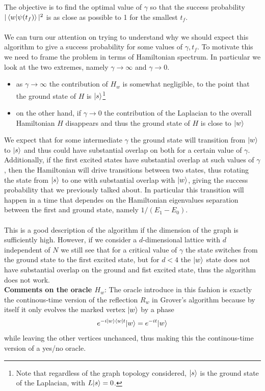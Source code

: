 \noindent
The objective is to find the optimal value of $\gamma$ so that the success probability $|\braket{w|\psi(t_f)}|^2$ is as close as possible to 1 for the smallest $t_f$. \\ \\
We can turn our attention on trying to understand why we should expect this algorithm to give a success probability for some values of $\gamma, t_f$. To motivate this we need to frame the problem in terms of Hamiltonian spectrum. In particular we look at the two extremes, namely $\gamma\rightarrow\infty$ and $\gamma\rightarrow 0$.
\begin{itemize}
  \item as $\gamma\rightarrow\infty$ the contribution of $H_w$ is somewhat negligible, to the point that the ground state of $H$ is ${|{s}\rangle}$\footnote{Note that regardless of the graph topology considered, ${|{s}\rangle}$ is the ground state of the Laplacian, with $L{|{s}\rangle} = 0$.}
  \item on the other hand, if $\gamma\rightarrow 0$ the contribution of the Laplacian to the overall Hamiltonian $H$ disappears and thus the ground state of $H$ is close to ${|{w}\rangle}$
\end{itemize}
We expect that for some intermediate $\gamma$ the ground state will transition from ${|{w}\rangle}$ to ${|{s}\rangle}$ and thus could have substantial overlap on both for a certain value of $\gamma$. Additionally, if the first excited states have substantial overlap at such values of $\gamma$, then the Hamiltonian will drive transitions between two states, thus rotating the state from ${|{s}\rangle}$ to one with substantial overlap with ${|{w}\rangle}$, giving the success probability that we previously talked about. In particular this transition will happen in a time that dependes on the Hamiltonian eigenvalues separation between the first and ground state, namely $1/(E_1-E_0)$. \\ \\This is a good description of the algorithm if the dimension of the graph is sufficiently high.  However, if we consider a $d$-dimensional lattice with $d$ independent of $N$ we still see that for a critical value of $\gamma$ the state switches from the ground state to the first excited state, but for $d<4$ the ${|{w}\rangle}$ state does not have substantial overlap on the ground and fist excited state, thus the algorithm does not work. \\
\textbf{Comments on the oracle $H_w$}: The oracle introduce in this fashion is exactly the continous-time version of the reflection $R_w$ in Grover's algorithm \cite{Wong2016} because by itself it only evolves the marked vertex ${|{w}\rangle}$ by a phase
\begin{equation}
  e^{-i{|{w}\rangle}{\langle{w}|}t}{|{w}\rangle} = e^{-it}{|{w}\rangle}
\end{equation}
while leaving the other vertices unchanced, thus making this the continous-time version of a yes/no oracle.

